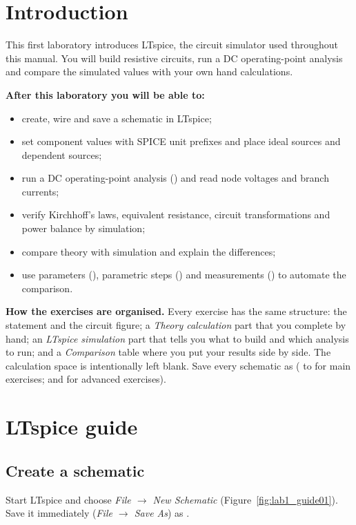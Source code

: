 
\section{Introduction}
This first laboratory introduces LTspice, the circuit simulator used throughout this manual. You will build resistive circuits, run a DC operating-point analysis and compare the simulated values with your own hand calculations.

\textbf{After this laboratory you will be able to:}
\begin{itemize}
  \item create, wire and save a schematic in LTspice;
  \item set component values with SPICE unit prefixes and place ideal sources and dependent sources;
  \item run a DC operating-point analysis () and read node voltages and branch currents;
  \item verify Kirchhoff's laws, equivalent resistance, circuit transformations and power balance by simulation;
  \item compare theory with simulation and explain the differences;
  \item use parameters (), parametric steps () and measurements () to automate the comparison.
\end{itemize}

\textbf{How the exercises are organised.} Every exercise has the same structure: the statement and the circuit figure; a \emph{Theory calculation} part that you complete by hand; an \emph{LTspice simulation} part that tells you what to build and which analysis to run; and a \emph{Comparison} table where you put your results side by side. The calculation space is intentionally left blank. Save every schematic as  ( to  for main exercises;  and  for advanced exercises).

\section{LTspice guide}
\subsection{Create a schematic}
Start LTspice and choose \textit{File $\rightarrow$ New Schematic} (Figure~\ref{fig:lab1_guide01}). Save it immediately (\textit{File $\rightarrow$ Save As}) as .

